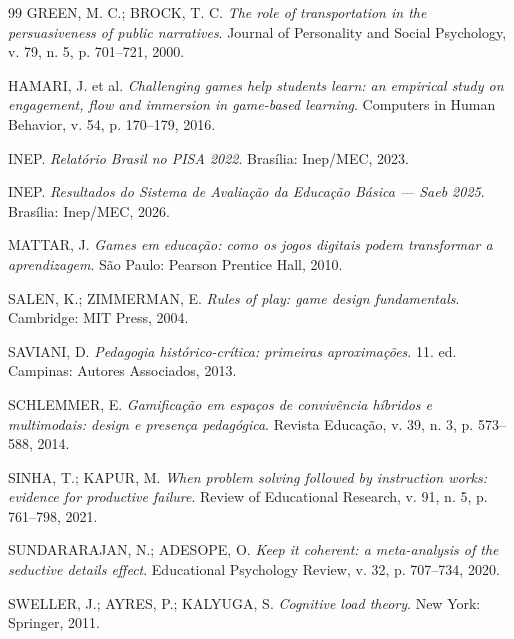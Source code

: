 \documentclass[11pt,a4paper]{article}
\begin{document}
\begin{thebibliography}{99}
GREEN, M. C.; BROCK, T. C.
\emph{The role of transportation in the persuasiveness of public narratives}.
Journal of Personality and Social Psychology, v. 79, n. 5, p. 701--721, 2000.

HAMARI, J. et al.
\emph{Challenging games help students learn: an empirical study on engagement, flow and immersion in game-based learning}.
Computers in Human Behavior, v. 54, p. 170--179, 2016.

INEP.
\emph{Relat\'orio Brasil no PISA 2022}.
Bras\'ilia: Inep/MEC, 2023.

INEP.
\emph{Resultados do Sistema de Avalia\c{c}\~ao da Educa\c{c}\~ao B\'asica --- Saeb 2025}.
Bras\'ilia: Inep/MEC, 2026.

MATTAR, J.
\emph{Games em educa\c{c}\~ao: como os jogos digitais podem transformar a aprendizagem}.
S\~ao Paulo: Pearson Prentice Hall, 2010.

SALEN, K.; ZIMMERMAN, E.
\emph{Rules of play: game design fundamentals}.
Cambridge: MIT Press, 2004.

SAVIANI, D.
\emph{Pedagogia hist\'orico-cr\'itica: primeiras aproxima\c{c}\~oes}.
11. ed. Campinas: Autores Associados, 2013.

SCHLEMMER, E.
\emph{Gamifica\c{c}\~ao em espa\c{c}os de conviv\^encia h\'ibridos e multimodais: design e presen\c{c}a pedag\'ogica}.
Revista Educa\c{c}\~ao, v. 39, n. 3, p. 573--588, 2014.

SINHA, T.; KAPUR, M.
\emph{When problem solving followed by instruction works: evidence for productive failure}.
Review of Educational Research, v. 91, n. 5, p. 761--798, 2021.

SUNDARARAJAN, N.; ADESOPE, O.
\emph{Keep it coherent: a meta-analysis of the seductive details effect}.
Educational Psychology Review, v. 32, p. 707--734, 2020.

SWELLER, J.; AYRES, P.; KALYUGA, S.
\emph{Cognitive load theory}.
New York: Springer, 2011.

\end{thebibliography}
\end{document}
